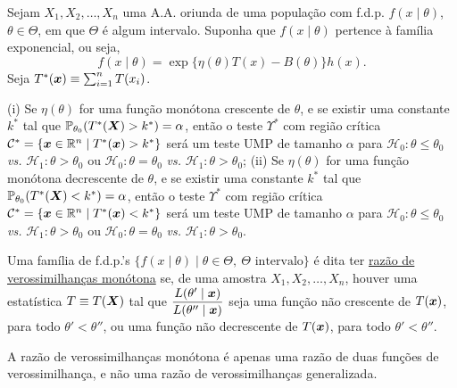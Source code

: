 \begin{theorem}
Sejam $X_1,X_2,\ldots,X_n$ uma A.A. oriunda de uma população com f.d.p. $f(x\mid\theta)$, $\theta\in\Theta$, em que $\Theta$ é algum intervalo. Suponha que $f(x\mid\theta)$ pertence à família exponencial, ou seja,
\begin{equation}
f(x\mid\theta)=\exp\{\eta(\theta)T(x)-B(\theta)\}h(x).
\end{equation}
Seja $T^*(\bm{x})\equiv\sum_{i=1}^n T(x_i)$.
\begin{outline}
\1 (i) Se $\eta(\theta)$ for uma função monótona crescente de $\theta$, e se existir uma constante $k^*$ tal que $\mathbb{P}_{\theta_0}(T^*(\bm{X})>k^*)=\alpha$, então o teste $\Upsilon^*$ com região crítica $\mathcal{C}^*=\{\bm{x}\in\mathbb{R}^n\mid T^*(\bm{x})>k^*\}$ será um teste UMP de tamanho $\alpha$ para $\mathcal{H}_0:\theta\leq\theta_0$ \emph{vs.} $\mathcal{H}_1:\theta>\theta_0$ ou $\mathcal{H}_0:\theta=\theta_0$ \emph{vs.} $\mathcal{H}_1:\theta>\theta_0$;
\1 (ii) Se $\eta(\theta)$ for uma função monótona decrescente de $\theta$, e se existir uma constante $k^*$ tal que $\mathbb{P}_{\theta_0}(T^*(\bm{X})<k^*)=\alpha$, então o teste $\Upsilon^*$ com região crítica $\mathcal{C}^*=\{\bm{x}\in\mathbb{R}^n\mid T^*(\bm{x})<k^*\}$ será um teste UMP de tamanho $\alpha$ para $\mathcal{H}_0:\theta\leq\theta_0$ \emph{vs.} $\mathcal{H}_1:\theta>\theta_0$ ou $\mathcal{H}_0:\theta=\theta_0$ \emph{vs.} $\mathcal{H}_1:\theta>\theta_0$.
\end{outline}
\end{theorem}

\begin{definition}
Uma família de f.d.p.'s $\{f(x\mid\theta)\mid\theta\in\Theta,\ \Theta\text{ intervalo}\}$ é dita ter \uline{razão de verossimilhanças monótona} se, de uma amostra $X_1,X_2,\ldots,X_n$, houver uma estatística $T\equiv T(\bm{X})$ tal que $\dfrac{L(\theta'\mid\bm{x})}{L(\theta''\mid\bm{x})}$ seja uma função não crescente de $T(\bm{x})$, para todo $\theta'<\theta''$, ou uma função não decrescente de $T(\bm{x})$, para todo $\theta'<\theta''$.
\end{definition}

\begin{note}
	\leavevmode
	\begin{outline}[enumerate]
		\1 A razão de verossimilhanças monótona é apenas uma razão de duas funções de verossimilhança, e não uma razão de verossimilhanças generalizada.
	\end{outline}
\end{note}

